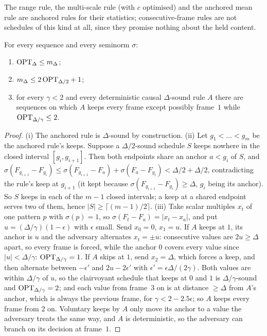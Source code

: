 The range rule, the multi-scale rule (with $c$ optimised) and the anchored mean rule are anchored rules for their statistics; consecutive-frame rules are not schedules of this kind at all, since they promise nothing about the held content.

\begin{theorem}
\label{thm:opt}
For every sequence and every seminorm $\sigma$:
\begin{enumerate}[label=(\roman*)]
\item $\mathrm{OPT}_\Delta \le m_\Delta$;
\item $m_\Delta \le 2\,\mathrm{OPT}_{\Delta/2} + 1$;
\item for every $\gamma < 2$ and every deterministic causal $\Delta$-sound rule $A$ there are sequences on which $A$ keeps every frame except possibly frame~$1$ while $\mathrm{OPT}_{\Delta/\gamma} \le 2$.
\end{enumerate}
\end{theorem}

\begin{proof}
(i) The anchored rule is $\Delta$-sound by construction.
(ii) Let $g_1 < \dots < g_m$ be the anchored rule's keeps. Suppose a $\Delta/2$-sound schedule $S$ keeps nowhere in the closed interval $[g_i, g_{i+1}]$. Then both endpoints share an anchor $a < g_i$ of $S$, and
$\sigma(F_{g_{i+1}} - F_{g_i}) \le \sigma(F_{g_{i+1}} - F_a) + \sigma(F_a - F_{g_i}) < \Delta/2 + \Delta/2$,
contradicting the rule's keep at $g_{i+1}$ (it kept because $\sigma(F_{g_{i+1}} - F_{g_i}) \ge \Delta$, $g_i$ being its anchor). So $S$ keeps in each of the $m - 1$ closed intervals; a keep at a shared endpoint serves two of them, hence $|S| \ge \lceil (m-1)/2 \rceil$.
(iii) Take scalar multiples $x_t$ of one pattern $p$ with $\sigma(p) = 1$, so $\sigma(F_t - F_a) = |x_t - x_a|$, and put $u = (\Delta/\gamma)(1 - \epsilon)$ with $\epsilon$ small. Send $x_0 = 0$, $x_1 = u$. If $A$ keeps at $1$, its anchor is $u$ and the adversary alternates $x_t = \pm u$: consecutive values are $2u \ge \Delta$ apart, so every frame is forced, while the anchor $0$ covers every value since $|u| < \Delta/\gamma$: $\mathrm{OPT}_{\Delta/\gamma} = 1$. If $A$ skips at $1$, send $x_2 = \Delta$, which forces a keep, and then alternate between $-\epsilon'$ and $2u - 2\epsilon'$ with $\epsilon' = \epsilon\Delta/(2\gamma)$. Both values are within $\Delta/\gamma$ of $u$, so the clairvoyant schedule that keeps at $0$ and $1$ is $\Delta/\gamma$-sound and $\mathrm{OPT}_{\Delta/\gamma} = 2$; and each value from frame~$3$ on is at distance $\ge \Delta$ from $A$'s anchor, which is always the previous frame, for $\gamma < 2 - 2.5\epsilon$; so $A$ keeps every frame from $2$ on. Voluntary keeps by $A$ only move its anchor to a value the adversary treats the same way, and $A$ is deterministic, so the adversary can branch on its decision at frame~$1$.
\end{proof}

